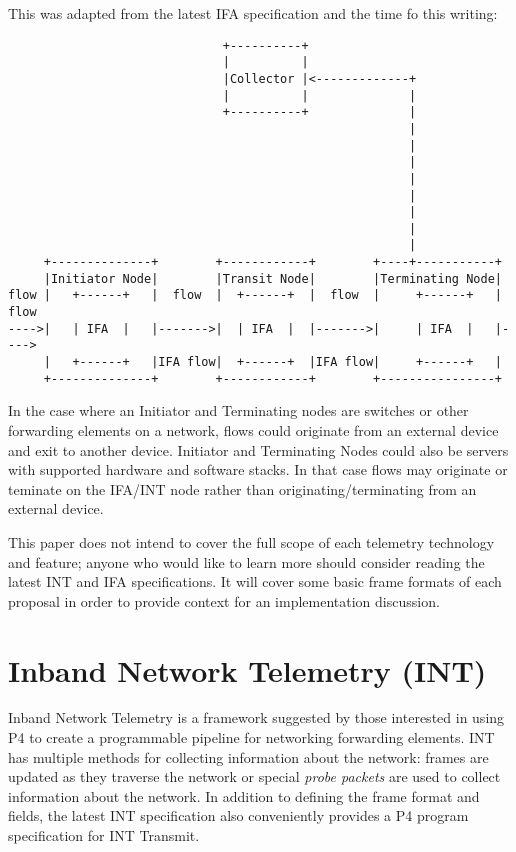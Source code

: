 \documentclass[letterpaper,twocolumn,10pt]{article}
\begin{document}
This was adapted from the latest IFA specification and the time fo this
writing:
\tiny
\begin{center}
\begin{verbatim}
                              +----------+
                              |          |
                              |Collector |<-------------+
                              |          |              |
                              +----------+              |
                                                        |
                                                        |
                                                        |
                                                        |
                                                        |
                                                        |
                                                        | 
                                                        |
     +--------------+        +------------+        +----+-----------+
     |Initiator Node|        |Transit Node|        |Terminating Node|
flow |   +------+   |  flow  |  +------+  |  flow  |     +------+   | flow
---->|   | IFA  |   |------->|  | IFA  |  |------->|     | IFA  |   |---->
     |   +------+   |IFA flow|  +------+  |IFA flow|     +------+   |
     +--------------+        +------------+        +----------------+
\end{verbatim}
\end{center}
\normalsize

In the case where an Initiator and Terminating nodes are switches or
other forwarding elements on a network, flows could originate from an
external device and exit to another device.  Initiator and Terminating
Nodes could also be servers with supported hardware and software stacks.
In that case flows may originate or teminate on the IFA/INT node rather
than originating/terminating from an external device.

This paper does not intend to cover the full scope of each telemetry
technology and feature; anyone who would like to learn more should
consider reading the latest INT and IFA specifications.  It will cover
some basic frame formats of each proposal in order to provide context
for an implementation discussion.

\section{Inband Network Telemetry (INT)}

Inband Network Telemetry is a framework suggested by
those interested in using P4 to create a programmable pipeline for
networking forwarding elements.  INT has multiple methods for collecting
information about the network: frames are updated as they traverse the
network or special \textit{probe packets} are used to collect
information about the network.  In addition to defining the frame format
and fields, the latest INT specification also conveniently provides a P4
program specification for INT Transmit.
\end{document}
